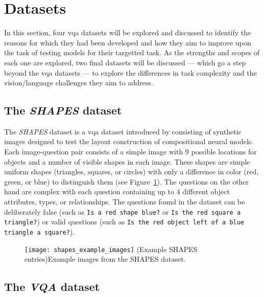\graphicspath{{content/chapters/literature_review/datasets/figures}}

\section{Datasets}
\label{sec:datasets}

In this section, four \gls{vqa} datasets will be explored and discussed to identify the reasons for which they had been developed and how they aim to improve upon the task of testing models for their targetted task.
As the strengths and scopes of each one are explored, two final datasets will be discussed --- which go a step beyond the \gls{vqa} datasets --- to explore the differences in task complexity and the vision/language challenges they aim to address.

\subsection{The \textit{SHAPES} dataset}
\label{subsec:shapes_dataset}

The \textit{SHAPES} dataset is a \gls{vqa} dataset introduced by \citeauthor{andreas_deep_2016} \cite{andreas_deep_2016} consisting of synthetic images designed to test the layout construction of compositional neural models.
Each image-question pair consists of a simple image with 9 possible locations for objects and a number of visible shapes in each image.
These shapes are simple uniform shapes (triangles, squares, or circles) with only a difference in color  (red, green, or blue) to distinguish them (see Figure~\ref{fig:shapes_example_images}).
The questions on the other hand are complex with each question containing up to 4 different object attributes, types, or relationships.
The questions found in the dataset can be deliberately false (such as \texttt{Is a red shape blue?} or \texttt{Is the red square a triangle?}) or valid questions (such as \texttt{Is the red object left of a blue triangle a square?}).

\begin{figure}[htbp]
    \centering
    \texttt{[image: shapes\_example\_images]}
    \captionsource(Example SHAPES entries){Example images from the SHAPES dataset. \label{fig:shapes_example_images}}{\citeauthor{andreas_neural_2016}\cite{andreas_neural_2016}}
\end{figure}

\subsection{The \textit{VQA} dataset}
\label{subsec:vqa_dataset}

